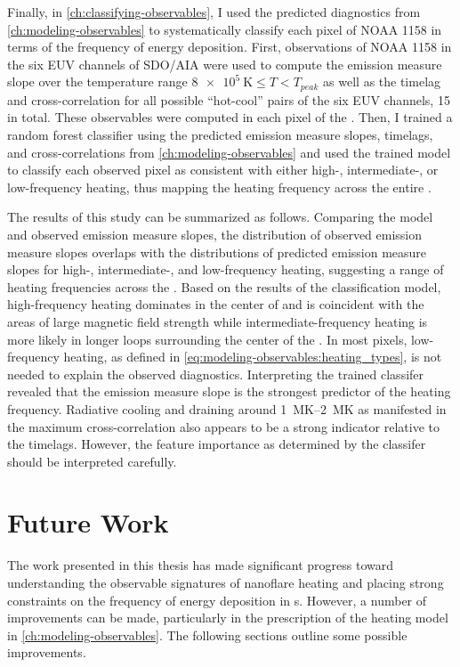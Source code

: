 Finally, in \autoref{ch:classifying-observables}, I used the predicted diagnostics from \autoref{ch:modeling-observables} to systematically classify each pixel of \AR{} NOAA 1158 in terms of the frequency of energy deposition. First, observations of NOAA 1158 in the six EUV channels of SDO/AIA were used to compute the emission measure slope over the temperature range $\SI{8e5}{\kelvin}\le T < T_{peak}$ as well as the timelag and cross-correlation for all possible ``hot-cool'' pairs of the six EUV channels, 15 in total. These observables were computed in each pixel of the \AR{}. Then, I trained a random forest classifier using the predicted emission measure slopes, timelags, and cross-correlations from \autoref{ch:modeling-observables} and used the trained model to classify each observed pixel as consistent with either high-, intermediate-, or low-frequency heating, thus mapping the heating frequency across the entire \AR{}.

The results of this study can be summarized as follows. Comparing the model and observed emission measure slopes, the distribution of observed emission measure slopes overlaps with the distributions of predicted emission measure slopes for high-, intermediate-, and low-frequency heating, suggesting a range of heating frequencies across the \AR{}. Based on the results of the classification model, high-frequency heating dominates in the center of \AR{} and is coincident with the areas of large magnetic field strength while intermediate-frequency heating is more likely in longer loops surrounding the center of the \AR{}. In most pixels, low-frequency heating, as defined in \autoref{eq:modeling-observables:heating_types}, is not needed to explain the observed diagnostics. Interpreting the trained classifer revealed that the emission measure slope is the strongest predictor of the heating frequency. Radiative cooling and draining around \SIrange{1}{2}{\mega\kelvin} as manifested in the maximum cross-correlation also appears to be a strong indicator relative to the timelags. However, the feature importance as determined by the classifer should be interpreted carefully.

\section{Future Work}\label{sec:future-work}

The work presented in this thesis has made significant progress toward understanding the observable signatures of nanoflare heating and placing strong constraints on the frequency of energy deposition in \AR s. However, a number of improvements can be made, particularly in the prescription of the heating model in \autoref{ch:modeling-observables}. The following sections outline some possible improvements.

